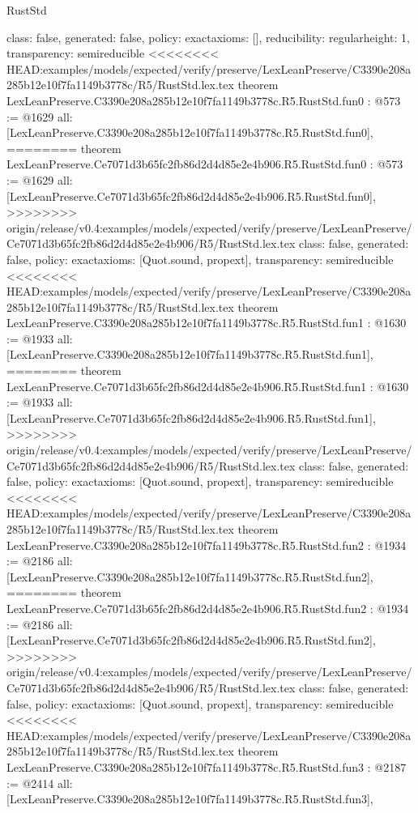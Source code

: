 \begin{lexlean}{RustStd}
\begin{coremodule}
{\begin{coremodule}
{{{  class: false,
  generated: false,
  policy: exact{axioms: []},
  reducibility: regular{height: 1},
  transparency: semireducible
}
<<<<<<<< HEAD:examples/models/expected/verify/preserve/LexLeanPreserve/C3390e208a285b12e10f7fa1149b3778c/R5/RustStd.lex.tex
theorem LexLeanPreserve.C3390e208a285b12e10f7fa1149b3778c.R5.RustStd.fun0 : @573 := @1629 {
  all: [LexLeanPreserve.C3390e208a285b12e10f7fa1149b3778c.R5.RustStd.fun0],
========
theorem LexLeanPreserve.Ce7071d3b65fc2fb86d2d4d85e2e4b906.R5.RustStd.fun0 : @573 := @1629 {
  all: [LexLeanPreserve.Ce7071d3b65fc2fb86d2d4d85e2e4b906.R5.RustStd.fun0],
>>>>>>>> origin/release/v0.4:examples/models/expected/verify/preserve/LexLeanPreserve/Ce7071d3b65fc2fb86d2d4d85e2e4b906/R5/RustStd.lex.tex
  class: false,
  generated: false,
  policy: exact{axioms: [Quot.sound, propext]},
  transparency: semireducible
}
<<<<<<<< HEAD:examples/models/expected/verify/preserve/LexLeanPreserve/C3390e208a285b12e10f7fa1149b3778c/R5/RustStd.lex.tex
theorem LexLeanPreserve.C3390e208a285b12e10f7fa1149b3778c.R5.RustStd.fun1 : @1630 := @1933 {
  all: [LexLeanPreserve.C3390e208a285b12e10f7fa1149b3778c.R5.RustStd.fun1],
========
theorem LexLeanPreserve.Ce7071d3b65fc2fb86d2d4d85e2e4b906.R5.RustStd.fun1 : @1630 := @1933 {
  all: [LexLeanPreserve.Ce7071d3b65fc2fb86d2d4d85e2e4b906.R5.RustStd.fun1],
>>>>>>>> origin/release/v0.4:examples/models/expected/verify/preserve/LexLeanPreserve/Ce7071d3b65fc2fb86d2d4d85e2e4b906/R5/RustStd.lex.tex
  class: false,
  generated: false,
  policy: exact{axioms: [Quot.sound, propext]},
  transparency: semireducible
}
<<<<<<<< HEAD:examples/models/expected/verify/preserve/LexLeanPreserve/C3390e208a285b12e10f7fa1149b3778c/R5/RustStd.lex.tex
theorem LexLeanPreserve.C3390e208a285b12e10f7fa1149b3778c.R5.RustStd.fun2 : @1934 := @2186 {
  all: [LexLeanPreserve.C3390e208a285b12e10f7fa1149b3778c.R5.RustStd.fun2],
========
theorem LexLeanPreserve.Ce7071d3b65fc2fb86d2d4d85e2e4b906.R5.RustStd.fun2 : @1934 := @2186 {
  all: [LexLeanPreserve.Ce7071d3b65fc2fb86d2d4d85e2e4b906.R5.RustStd.fun2],
>>>>>>>> origin/release/v0.4:examples/models/expected/verify/preserve/LexLeanPreserve/Ce7071d3b65fc2fb86d2d4d85e2e4b906/R5/RustStd.lex.tex
  class: false,
  generated: false,
  policy: exact{axioms: [Quot.sound, propext]},
  transparency: semireducible
}
<<<<<<<< HEAD:examples/models/expected/verify/preserve/LexLeanPreserve/C3390e208a285b12e10f7fa1149b3778c/R5/RustStd.lex.tex
theorem LexLeanPreserve.C3390e208a285b12e10f7fa1149b3778c.R5.RustStd.fun3 : @2187 := @2414 {
  all: [LexLeanPreserve.C3390e208a285b12e10f7fa1149b3778c.R5.RustStd.fun3],
}}}}}}
\end{coremodule}}
\end{coremodule}
\end{lexlean}
